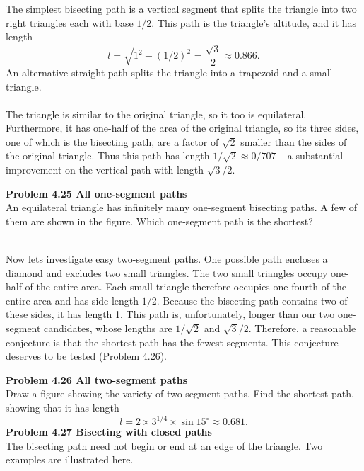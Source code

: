 \documentclass[12pt]{book}
\begin{document}
\noindent The simplest bisecting path is a vertical segment that splits the triangle into two right triangles each with base $1\!/2$. This
path is the triangle's altitude, and it has length
\begin{equation}
l=\sqrt{1^{2}-(1\!/2)^{2}}=\frac{\sqrt{3}}{2} \approx 0.866.
\end{equation}
An alternative straight path splits the triangle into a trapezoid and a small triangle.\\

\\

\noindent The triangle is similar to the original triangle, so it too is equilateral.\\Furthermore, it has one-half of the area of the original triangle, so its three sides, one of which is the bisecting path, are a factor of $\sqrt{2}$ smaller than the sides of the original triangle. Thus this path has length $1\!/\sqrt{2} \approx 0/707$ -- a substantial improvement on the vertical path with length $\sqrt{3}\!/2$.\\

\colorbox{light-gray}{
\begin{minipage}{\textwidth}
{\bf Problem 4.25 All one-segment paths}\\
An equilateral triangle has infinitely many one-segment bisecting paths. A few of them are shown in the figure. Which one-segment path is the shortest?
\end{minipage}
}\\

\noindent Now lets investigate easy two-segment paths. One possible path encloses a diamond and excludes two small triangles. The two small triangles occupy one-half of the entire area. Each small triangle therefore occupies one-fourth of the entire area and has side length $1\!/2$. Because the bisecting path contains two of these sides, it has length 1. This path is, unfortunately, longer than our two one-segment candidates, whose lengths are $1\!/\sqrt{2}$ and $\sqrt{3}\!/2$. Therefore, a reasonable conjecture is that the shortest path has the fewest segments. This conjecture deserves to be tested (Problem 4.26).\\

\colorbox{light-gray}{
\begin{minipage}{\textwidth}
{\bf Problem 4.26 All two-segment paths}\\
Draw a figure showing the variety of two-segment paths. Find the shortest path,
showing that it has length
\begin{equation}
l=2\times 3^{1\!/4}\times \sin 15^{\circ} \approx 0.681.
\end{equation}
{\bf Problem 4.27 Bisecting with closed paths}\\
The bisecting path need not begin or end at an edge of the triangle. Two examples are illustrated here.
\end{minipage}
}\\
\end{document}
